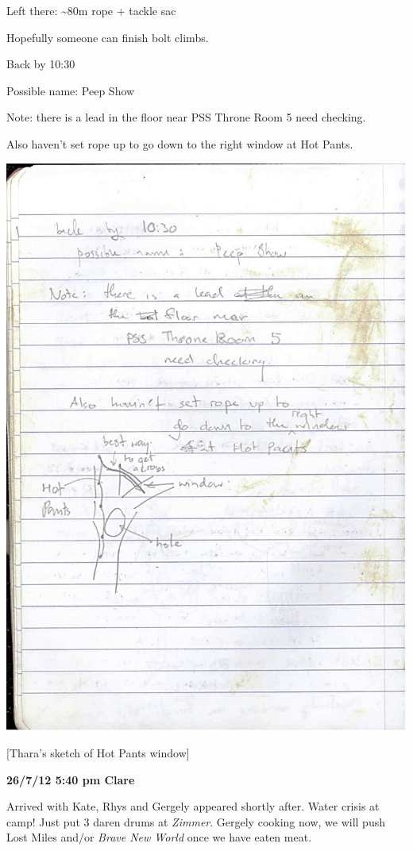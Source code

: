 Left there: \textasciitilde{}80m rope + tackle sac

Hopefully someone can finish bolt climbs.

Back by 10:30

Possible name: Peep Show

Note: there is a lead in the floor near PSS Throne Room 5 need checking.

Also haven't set rope up to go down to the right window at Hot Pants.

\includegraphics{UgLog1012/77.jpeg}

{[}Thara's sketch of Hot Pants window{]}

\textbf{26/7/12 5:40 pm Clare}

Arrived with Kate, Rhys and Gergely appeared shortly after. Water crisis
at camp! Just put 3 daren drums at \emph{Zimmer}. Gergely cooking now,
we will push Lost Miles and/or \emph{Brave New World} once we have eaten
meat.

